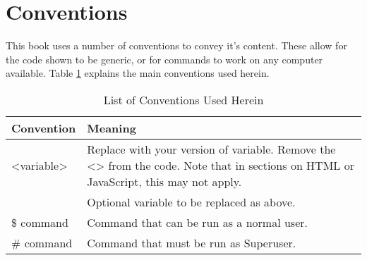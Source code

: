 \documentclass[twoside,a4paper,11pt]{report}
\begin{document}
	\section*{Conventions}
		This book uses a number of conventions to convey it's content. 
		These allow for the code shown to be generic, or for commands to work on any computer available. 
		Table \ref{tab:BookConventions} explains the main conventions used herein. 
		\begin{table}[htb]
			\centering
			\begin{tabular}{|l|p{7cm}|}
				\hline
				\textbf{Convention} & \textbf{Meaning} \\ \hline
				<variable> & Replace with your version of variable. 
								Remove the <> from the code. 
								Note that in sections on HTML or JavaScript, this may not apply. \\ \hline
				[variable] & Optional variable to be replaced as above. \\ \hline
				\$ command & Command that can be run as a normal user. \\ \hline
				\# command & Command that must be run as Superuser. \\ \hline
			\end{tabular}
			\caption{List of Conventions Used Herein}
			\label{tab:BookConventions}
		\end{table}
\mainmatter















\appendix
	\label{ch:Appendix}
	
	
	\printindex
\end{document}
